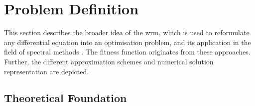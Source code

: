 \documentclass[./\jobname.tex]{subfiles}
\begin{document}
\section{Problem Definition}
This section describes the broader idea of the \gls{wrm}, which is used to reformulate any differential equation into an optimisation problem, and its application in the field of spectral methods \cite{shen_spectral_2011}. The fitness function originates from these approaches. Further, the different approximation schemes and numerical solution representation are depicted. 

\subsection{Theoretical Foundation}
\label{chap:opt_problem}
\end{document}
